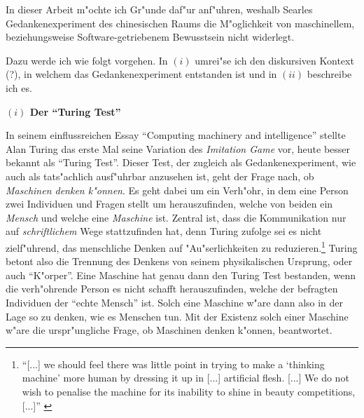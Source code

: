 \documentclass[a4paper, emulatestandardclasses, 12pt]{scrartcl}
\begin{document}
\begin{onehalfspace} 

%


\noindent In dieser Arbeit m"ochte ich Gr"unde daf"ur anf"uhren, weshalb Searles Gedankenexperiment des chinesischen Raums die M"oglichkeit von maschinellem, beziehungsweise Software-getriebenem Bewusstsein nicht widerlegt.

Dazu werde ich wie folgt vorgehen. In $(i)$ umrei"se ich den diskursiven Kontext (?), in welchem das Gedankenexperiment entstanden ist und in $(ii)$ beschreibe ich es. %
\vspace{5mm}


\noindent\textbf{$(i)$ Der "`Turing Test"'}

\noindent In seinem einflussreichen Essay "`Computing machinery and intelligence"' \citep{turing1950computing} stellte Alan Turing das erste Mal seine Variation des \emph{Imitation Game} vor, heute besser bekannt als "`Turing Test"'. Dieser Test, der zugleich als Gedankenexperiment, wie auch als tats"achlich ausf"uhrbar anzusehen ist, geht der Frage nach, ob \emph{Maschinen denken k"onnen}. Es geht dabei um ein Verh"ohr, in dem eine Person zwei Individuen und Fragen stellt um herauszufinden, welche von beiden ein \emph{Mensch} und welche eine \emph{Maschine} ist. Zentral ist, dass die Kommunikation nur auf \emph{schriftlichem} Wege stattzufinden hat, denn Turing zufolge sei es nicht zielf"uhrend, das menschliche Denken auf "Au"serlichkeiten zu reduzieren.\footnote{"`[...] we should feel there was little point in trying to make a `thinking machine' more human by dressing it up in [...] artificial flesh. [...] We do not wish to penalise the machine for its inability to shine in beauty competitions, [...]"' \citep[S. 434]{turing1950computing}} Turing betont also die Trennung des Denkens von seinem physikalischen Ursprung, oder auch "`K"orper"'. Eine Maschine hat genau dann den Turing Test bestanden, wenn die verh"ohrende Person es nicht schafft herauszufinden, welche der befragten Individuen der "`echte Mensch"' ist. Solch eine Maschine w"are dann also in der Lage so zu denken, wie es Menschen tun. Mit der Existenz solch einer Maschine w"are die urspr"ungliche Frage, ob Maschinen denken k"onnen, beantwortet.


\end{onehalfspace}
\end{document}
